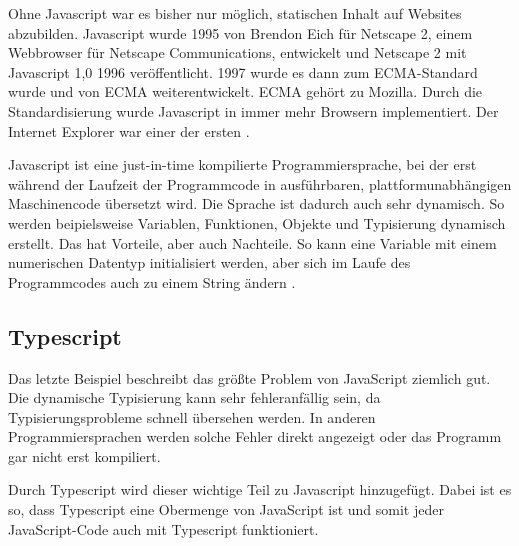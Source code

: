 Ohne Javascript war es bisher nur möglich, statischen Inhalt auf Websites abzubilden. Javascript wurde 1995 von Brendon Eich für Netscape 2, einem Webbrowser für Netscape Communications, entwickelt und Netscape 2 mit Javascript 1,0 1996 veröffentlicht. 1997 wurde es dann zum ECMA-Standard wurde und von ECMA weiterentwickelt. ECMA gehört zu Mozilla. Durch die Standardisierung wurde Javascript in immer mehr Browsern implementiert. Der Internet Explorer war einer der ersten \parencite[vgl.][]{w3c_javascript_nodate}.

Javascript ist eine just-in-time kompilierte Programmiersprache, bei der erst während der Laufzeit der Programmcode in ausführbaren, plattformunabhängigen Maschinencode übersetzt wird. Die Sprache ist dadurch auch sehr dynamisch. So werden beipielsweise Variablen, Funktionen, Objekte und Typisierung dynamisch erstellt. Das hat Vorteile, aber auch Nachteile. So kann eine Variable mit einem numerischen Datentyp initialisiert werden, aber sich im Laufe des Programmcodes auch zu einem String ändern \parencite[vgl.][]{mdn_javascript_nodate}.

\subsection{Typescript}

Das letzte Beispiel beschreibt das größte Problem von JavaScript ziemlich gut. Die dynamische Typisierung kann sehr fehleranfällig sein, da Typisierungsprobleme schnell übersehen werden. In anderen Programmiersprachen werden solche Fehler direkt angezeigt oder das Programm gar nicht erst kompiliert.

Durch Typescript wird dieser wichtige Teil zu Javascript hinzugefügt. Dabei ist es so, dass Typescript eine Obermenge von JavaScript ist und somit jeder JavaScript-Code auch mit Typescript funktioniert. \parencite[vgl.][]{ts_typescript_nodate}

